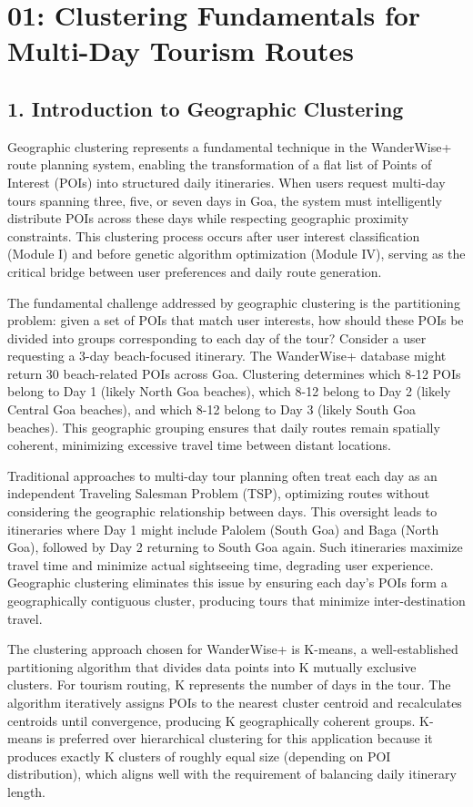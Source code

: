 \chapter{01: Clustering Fundamentals for Multi-Day Tourism Routes}

\section{1. Introduction to Geographic Clustering}

Geographic clustering represents a fundamental technique in the WanderWise+ route planning system, enabling the transformation of a flat list of Points of Interest (POIs) into structured daily itineraries. When users request multi-day tours spanning three, five, or seven days in Goa, the system must intelligently distribute POIs across these days while respecting geographic proximity constraints. This clustering process occurs after user interest classification (Module I) and before genetic algorithm optimization (Module IV), serving as the critical bridge between user preferences and daily route generation.

The fundamental challenge addressed by geographic clustering is the partitioning problem: given a set of POIs that match user interests, how should these POIs be divided into groups corresponding to each day of the tour? Consider a user requesting a 3-day beach-focused itinerary. The WanderWise+ database might return 30 beach-related POIs across Goa. Clustering determines which 8-12 POIs belong to Day 1 (likely North Goa beaches), which 8-12 belong to Day 2 (likely Central Goa beaches), and which 8-12 belong to Day 3 (likely South Goa beaches). This geographic grouping ensures that daily routes remain spatially coherent, minimizing excessive travel time between distant locations.

Traditional approaches to multi-day tour planning often treat each day as an independent Traveling Salesman Problem (TSP), optimizing routes without considering the geographic relationship between days. This oversight leads to itineraries where Day 1 might include Palolem (South Goa) and Baga (North Goa), followed by Day 2 returning to South Goa again. Such itineraries maximize travel time and minimize actual sightseeing time, degrading user experience. Geographic clustering eliminates this issue by ensuring each day's POIs form a geographically contiguous cluster, producing tours that minimize inter-destination travel.

The clustering approach chosen for WanderWise+ is K-means, a well-established partitioning algorithm that divides data points into K mutually exclusive clusters. For tourism routing, K represents the number of days in the tour. The algorithm iteratively assigns POIs to the nearest cluster centroid and recalculates centroids until convergence, producing K geographically coherent groups. K-means is preferred over hierarchical clustering for this application because it produces exactly K clusters of roughly equal size (depending on POI distribution), which aligns well with the requirement of balancing daily itinerary length.

